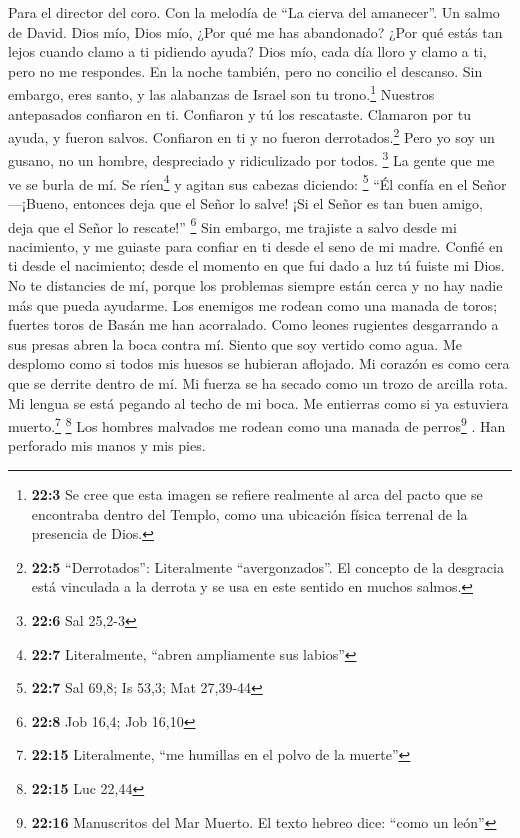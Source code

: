 Para el director del coro. Con la melodía de ``La cierva del amanecer''.
Un salmo de David.  Dios mío, Dios mío, ¿Por qué me has
abandonado? ¿Por qué estás tan lejos cuando clamo a ti pidiendo ayuda?
 Dios mío, cada día lloro y clamo a ti, pero no me
respondes. En la noche también, pero no concilio el descanso.
 Sin embargo, eres santo, y las alabanzas de Israel son tu
trono.\footnote{\textbf{22:3} Se cree que esta imagen se refiere
  realmente al arca del pacto que se encontraba dentro del Templo, como
  una ubicación física terrenal de la presencia de Dios.} 
Nuestros antepasados confiaron en ti. Confiaron y tú los rescataste.
 Clamaron por tu ayuda, y fueron salvos. Confiaron en ti y
no fueron derrotados.\footnote{\textbf{22:5} ``Derrotados'':
  Literalmente ``avergonzados''. El concepto de la desgracia está
  vinculada a la derrota y se usa en este sentido en muchos salmos.}
 Pero yo soy un gusano, no un hombre, despreciado y
ridiculizado por todos. \footnote{\textbf{22:6} Sal 25,2-3}
 La gente que me ve se burla de mí. Se ríen\footnote{\textbf{22:7}
  Literalmente, ``abren ampliamente sus labios''} y agitan sus cabezas
diciendo: \footnote{\textbf{22:7} Sal 69,8; Is 53,3; Mat 27,39-44}
 ``Él confía en el Señor---¡Bueno, entonces deja que el
Señor lo salve! ¡Si el Señor es tan buen amigo, deja que el Señor lo
rescate!'' \footnote{\textbf{22:8} Job 16,4; Job 16,10} 
Sin embargo, me trajiste a salvo desde mi nacimiento, y me guiaste para
confiar en ti desde el seno de mi madre.  Confié en ti
desde el nacimiento; desde el momento en que fui dado a luz tú fuiste mi
Dios.  No te distancies de mí, porque los problemas
siempre están cerca y no hay nadie más que pueda ayudarme.
 Los enemigos me rodean como una manada de toros; fuertes
toros de Basán me han acorralado.  Como leones rugientes
desgarrando a sus presas abren la boca contra mí.  Siento
que soy vertido como agua. Me desplomo como si todos mis huesos se
hubieran aflojado. Mi corazón es como cera que se derrite dentro de mí.
 Mi fuerza se ha secado como un trozo de arcilla rota. Mi
lengua se está pegando al techo de mi boca. Me entierras como si ya
estuviera muerto.\footnote{\textbf{22:15} Literalmente, ``me humillas en
  el polvo de la muerte''} \footnote{\textbf{22:15} Luc 22,44}
 Los hombres malvados me rodean como una manada de
perros\footnote{\textbf{22:16} Manuscritos del Mar Muerto. El texto
  hebreo dice: ``como un león''} . Han perforado mis manos y mis pies.
